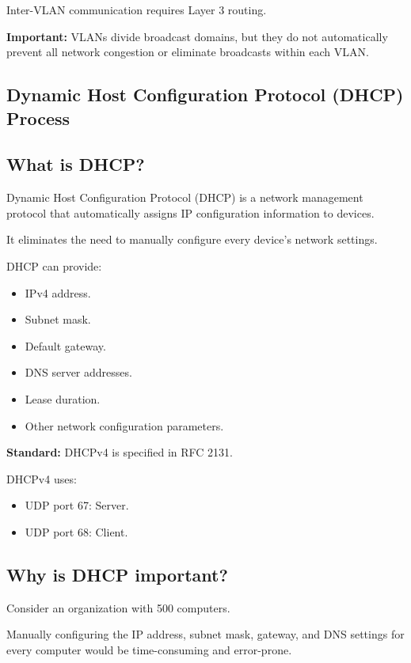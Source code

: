 Inter-VLAN communication requires Layer 3 routing.

\textbf{Important:} VLANs divide broadcast domains, but they do not automatically prevent all network congestion or eliminate broadcasts within each VLAN.

\subsection{Dynamic Host Configuration Protocol (DHCP) Process}

\subsection{What is DHCP?}

Dynamic Host Configuration Protocol (DHCP) is a network management protocol that automatically assigns IP configuration information to devices.

It eliminates the need to manually configure every device's network settings.

DHCP can provide:

\begin{itemize}
\item IPv4 address.
\item Subnet mask.
\item Default gateway.
\item DNS server addresses.
\item Lease duration.
\item Other network configuration parameters.
\end{itemize}

\textbf{Standard:} DHCPv4 is specified in RFC 2131.

DHCPv4 uses:

\begin{itemize}
\item UDP port 67: Server.
\item UDP port 68: Client.
\end{itemize}

\subsection{Why is DHCP important?}

Consider an organization with 500 computers.

Manually configuring the IP address, subnet mask, gateway, and DNS settings for every computer would be time-consuming and error-prone.


